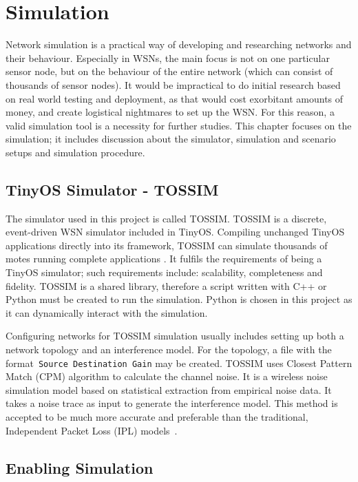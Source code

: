 \chapter{Simulation}
\label{Sim}
Network simulation is a practical way of developing and researching networks and their
behaviour. Especially in WSNs, the main focus is not on one particular sensor node, but on
the behaviour of the entire network (which can consist of thousands of sensor nodes). It would
be impractical to do initial research based on real world testing and deployment, as that would cost exorbitant amounts of money, and create logistical nightmares to set up the WSN. For this reason, a valid
simulation tool is a necessity for further studies. This chapter focuses on the simulation; it 
includes discussion about the simulator, simulation and scenario setups and simulation procedure.

\section{TinyOS Simulator - TOSSIM}
\label{Sim:TOSSIM}

The simulator used in this project is called TOSSIM\@. TOSSIM is a discrete, event-driven WSN simulator included in TinyOS. Compiling unchanged TinyOS applications
directly into its framework, TOSSIM can simulate thousands of motes running complete
applications \cite{LLWC}. It fulfils the requirements of being a TinyOS simulator; such requirements include: scalability, completeness and fidelity. TOSSIM is a shared library, therefore a script written with C++ or Python must be created to run the simulation.  Python is chosen in this project as it can dynamically interact with the simulation.
\newline

Configuring networks for TOSSIM simulation usually includes setting
up both a network topology and an interference model. For the topology, a file with the format~\texttt{Source Destination Gain} may be created. TOSSIM uses Closest Pattern Match (CPM) algorithm to calculate the channel noise. It is a wireless noise simulation model
based on statistical extraction from empirical noise data. It takes a noise trace as input to generate the interference model. This method is accepted to be much more accurate and preferable than the traditional, Independent Packet Loss (IPL) models~\cite{TOSSIM}.

\section{Enabling Simulation}
\label{Sim:Enabling}


